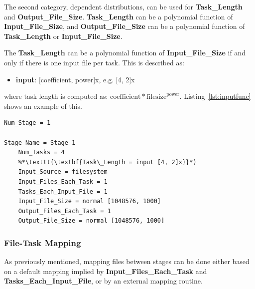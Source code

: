 \documentclass{sig-alternate}
\newenvironment{shortlist}{
        \vspace*{-0.5em}
  \begin{itemize}
  \setlength{\itemsep}{-0.1em}
}{
  \end{itemize}
        \vspace*{-0.5em}
}
\begin{document}
%
%
%
%
%


The second category, dependent distributions, can be used for \textbf{Task\_Length} and  \textbf{Output\_File\_Size}.  \textbf{Task\_Length} can be a polynomial function of \textbf{Input\_File\_Size}, and \textbf{Output\_File\_Size} can be a polynomial function of  \textbf{Task\_Length} or \textbf{Input\_File\_Size}.

The \textbf{Task\_Length} can be a polynomial function of \textbf{Input\_File\_Size} if and only if there is one input file per task. This is described as:
\begin{shortlist}
\item[]{\textbf{input}}: [coefficient, power]x, e.g. [4, 2]x
\end{shortlist}
where task length is computed as: \( \text{coefficient} * \text{filesize} ^ \text{power}\). 
Listing~\ref{lst:inputfunc} shows an example of this.

\begin{lstlisting}[caption= Task length as a function of input file size, label=lst:inputfunc, linewidth=1.0\textwidth, xleftmargin=2.5ex]
Num_Stage = 1

Stage_Name = Stage_1
    Num_Tasks = 4  
    %*\texttt{\textbf{Task\_Length = input [4, 2]x}}*)
    Input_Source = filesystem
    Input_Files_Each_Task = 1
    Tasks_Each_Input_File = 1
    Input_File_Size = normal [1048576, 1000]
    Output_Files_Each_Task = 1
    Output_File_Size = normal [1048576, 1000]
\end{lstlisting}

\subsubsection{File-Task Mapping}\label{sec:def_mapping}

As previously mentioned, mapping files between stages can be done either based on a default mapping implied by 
\textbf{Input\_Files\_Each\_Task} and \textbf{Tasks\_Each\_Input\_File}, or by an external mapping routine.
\end{document}
